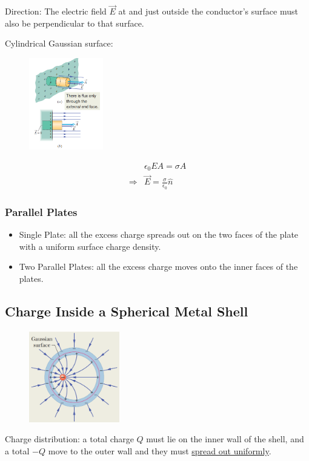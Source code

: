 \documentclass[11pt, a4paper]{article}
\begin{document}
Direction: The electric field $\vec{E}$ at and just outside the conductor’s surface must also be
perpendicular to that surface.

Cylindrical Gaussian surface: 
\begin{figure}[htbp]
    \centering
    \includegraphics[height = 4cm]{9.png}
\end{figure}
$$\begin{aligned}
    &\epsilon_0EA = \sigma A\\
    \Rightarrow& \vec{E} = \frac{\sigma}{\epsilon_0}\hat{n} 
\end{aligned}$$

\subsubsection{Parallel Plates}
\begin{itemize}
    \item Single Plate: all the excess charge spreads out on the
    two faces of the plate with a uniform surface charge density.
    \item Two Parallel Plates: all the excess charge moves onto the inner faces of the plates.
\end{itemize}

\subsection{Charge Inside a Spherical Metal Shell}
\begin{figure}[htbp]
    \centering
    \includegraphics[height = 4cm]{10.png}
\end{figure}
Charge distribution: a total charge $Q$ must lie on the inner wall of
the shell,  and a total $-Q$ move to the outer wall and they must \underline{spread out uniformly}.
\end{document}
